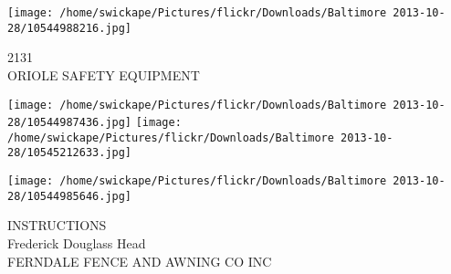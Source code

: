 \documentclass[10pt,letterpaper]{article}
\begin{document}
\vspace{0.25in}
\texttt{[image: /home/swickape/Pictures/flickr/Downloads/Baltimore 2013-10-28/10544988216.jpg]}

2131\\
ORIOLE SAFETY EQUIPMENT\\
\pagebreak

\texttt{[image: /home/swickape/Pictures/flickr/Downloads/Baltimore 2013-10-28/10544987436.jpg]}
\texttt{[image: /home/swickape/Pictures/flickr/Downloads/Baltimore 2013-10-28/10545212633.jpg]}

\texttt{[image: /home/swickape/Pictures/flickr/Downloads/Baltimore 2013-10-28/10544985646.jpg]}

INSTRUCTIONS\\
Frederick Douglass Head\\
FERNDALE FENCE AND AWNING CO INC\\
\pagebreak
\end{document}

